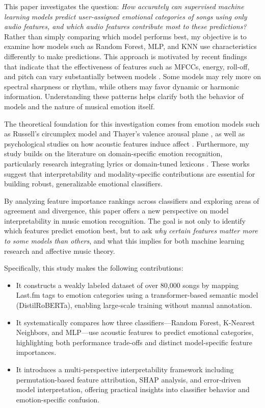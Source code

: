 \documentclass{article}
\begin{document}
This paper investigates the question: \textit{How accurately can supervised machine learning models predict user-assigned emotional categories of songs using only audio features, and which audio features contribute most to these predictions?} Rather than simply comparing which model performs best, my objective is to examine how models such as Random Forest, MLP, and KNN use characteristics differently to make predictions. This approach is motivated by recent findings that indicate that the effectiveness of features such as MFCCs, energy, roll-off, and pitch can vary substantially between models \parencite{Juthi2020, Rosner2018, Garg2022}. Some models may rely more on spectral sharpness or rhythm, while others may favor dynamic or harmonic information. Understanding these patterns helps clarify both the behavior of models and the nature of musical emotion itself.

The theoretical foundation for this investigation comes from emotion models such as Russell's circumplex model and Thayer's valence arousal plane \parencite{Helmholz2019}, as well as psychological studies on how acoustic features induce affect \parencite{McCraty1998, Leubner2017}. Furthermore, my study builds on the literature on domain-specific emotion recognition, particularly research integrating lyrics or domain-tuned lexicons \parencite{Bandhakavi2017, Xu2011}. These works suggest that interpretability and modality-specific contributions are essential for building robust, generalizable emotional classifiers.

By analyzing feature importance rankings across classifiers and exploring areas of agreement and divergence, this paper offers a new perspective on model interpretability in music emotion recognition. The goal is not only to identify which features predict emotion best, but to ask \textit{why certain features matter more to some models than others}, and what this implies for both machine learning research and affective music theory.

Specifically, this study makes the following contributions:

\begin{itemize}
    \item It constructs a weakly labeled dataset of over 80,000 songs by mapping Last.fm tags to emotion categories using a transformer-based semantic model (DistilRoBERTa), enabling large-scale training without manual annotation.
    \item It systematically compares how three classifiers—Random Forest, K-Nearest Neighbors, and MLP—use acoustic features to predict emotional categories, highlighting both performance trade-offs and distinct model-specific feature importances.
    \item It introduces a multi-perspective interpretability framework including permutation-based feature attribution, SHAP analysis, and error-driven model interpretation, offering practical insights into classifier behavior and emotion-specific confusion.
\end{itemize}
\end{document}
